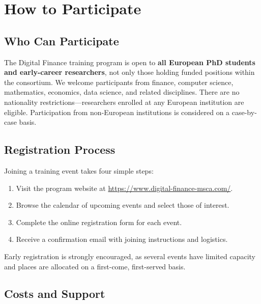 \chapter{How to Participate}
\label{ch:how-to-participate}

\section{Who Can Participate}
\label{sec:who-can-participate}

The Digital Finance training program is open to \textbf{all European PhD
students and early-career researchers}, not only those holding funded positions
within the consortium.  We welcome participants from finance, computer science,
mathematics, economics, data science, and related disciplines.  There are no
nationality restrictions---researchers enrolled at any European institution are
eligible.  Participation from non-European institutions is considered on a
case-by-case basis.

\section{Registration Process}
\label{sec:registration}

Joining a training event takes four simple steps:

\begin{enumerate}[nosep]
  \item Visit the program website at
        \url{https://www.digital-finance-msca.com/}.
  \item Browse the calendar of upcoming events and select those of interest.
  \item Complete the online registration form for each event.
  \item Receive a confirmation email with joining instructions and logistics.
\end{enumerate}

Early registration is strongly encouraged, as several events have limited
capacity and places are allocated on a first-come, first-served basis.

\section{Costs and Support}
\label{sec:costs}

